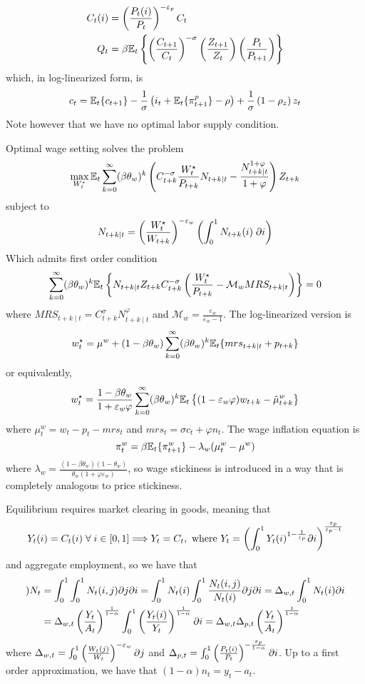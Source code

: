 \documentclass[10pt]{article}
\begin{document}
\begin{model}
	\begin{align*}
		C_t(i) &= \left( \frac{P_t(i)}{P_t}\right)^{-\varepsilon_p}C_t \\ Q_t &= \beta \mathbb{E}_t \left\{ \left( \frac{C_{t+1}}{C_t}\right)^{-\sigma}\left( \frac{Z_{t+1}}{Z_t}\right) \left( \frac{P_t}{P_{t+1}}\right)\right\}
	\end{align*}
	which, in log-linearized form, is\[c_t = \mathbb{E}_t\{c_{t+1}\} - \frac{1}{\sigma} \left( i_t + \mathbb{E}_t\{\pi_{t+1}^p\}-\rho\right) + \frac{1}{\sigma} \left( 1-\rho_z\right) z_t\]Note however that we have no optimal labor supply condition.
	
	Optimal wage setting solves the problem \[\max_{W_t^\star} \mathbb{E}_t \sum_{k=0}^\infty (\beta \theta_w)^k \left( C_{t+k}^{-\sigma} \frac{W_t^\star}{P_{t+k}}N_{t+k\mid t} - \frac{N_{t+k\mid t}^{1+\varphi}}{1+\varphi}\right) Z_{t+k}\]subject to\[N_{t+k\mid t} = \left( \frac{W_t^\star}{W_{t+k}}\right)^{-\varepsilon_w} \left( \int_0^1 N_{t+k}(i)\;\partial i\right)\]Which admits first order condition \[\sum_{k=0}^\infty (\beta\theta_w)^k \mathbb{E}_t \left\{ N_{t+k\mid t} Z_{t+k} C_{t+k}^{-\sigma} \left( \frac{W_t^\star}{P_{t+k}} - \mathcal{M}_w MRS_{t+k\mid t}\right)\right\} = 0\]where $MRS_{t+k\mid t} = C_{t+k}^\sigma N_{t+k\mid t}^\varphi$ and $\mathcal{M}_w = \frac{\varepsilon_w}{\varepsilon_w-1}$. The log-linearized version is \[w_t^\star = \mu^w + (1-\beta\theta_w) \sum_{k=0}^\infty (\beta\theta_w)^k \mathbb{E}_t\{mrs_{t+k\mid t} + p_{t+k}\}\]or equivalently, \[w_t^\star = \frac{1-\beta\theta_w}{1+\varepsilon_w\varphi} \sum_{k=0}^\infty (\beta\theta_w)^k \mathbb{E}_t\left\{ (1-\varepsilon_w\varphi)w_{t+k} - \hat{\mu}_{t+k}^w\right\}\]where $\mu_t^w = w_t - p_t - mrs_t$ and $mrs_t = \sigma c_t + \varphi n_t$. The wage inflation equation is \[\pi_t^w = \beta \mathbb{E}_t\{\pi_{t+1}^w\} - \lambda_w (\mu_t^w - \mu^w)\]where $\lambda_w = \frac{(1-\beta\theta_w)(1-\theta_w)}{\theta_w(1+\varphi \varepsilon_w)}$, so wage stickiness is introduced in a way that is completely analogous to price stickiness. 
	
	Equilibrium requires market clearing in goods, meaning that \[Y_t(i) = C_t(i) \forall i \in [0,1] \Longrightarrow Y_t = C_t,\text{ where } Y_t = \parl \int_0^1 Y_t(i)^{1-\frac{1}{\varepsilon_p}}\partial i\parr^{\frac{\varepsilon_p}{\varepsilon_p-1}}\]and aggregate employment, so we have that 
	\begin{align*})
		N_t &= \int_0^1 \int_0^1 N_t(i,j)\partial j \partial i = \int_0^1 N_t(i) \int_0^1 \frac{N_t(i,j)}{N_t(i)}\partial j\partial i = \Delta_{w,t} \int_0^1 N_t(i)\partial i \\ 
		&= \Delta_{w,t} \left( \frac{Y_t}{A_t}\right)^{\frac{1}{1-\alpha}} \int_0^1 \left( \frac{Y_t(i)}{Y_t}\right)^{\frac{1}{1-\alpha}}\partial i = \Delta_{w,t} \Delta_{p,t} \left( \frac{Y_t}{A_t}\right)^{\frac{1}{1-\alpha}}
 	\end{align*}
 	where $\Delta_{w,t} = \int_0^1 \left( \frac{W_t(j)}{W_t}\right)^{-\varepsilon_w}\partial j$ and $\Delta_{p,t} = \int_0^1 \left( \frac{P_t(i)}{P_t}\right)^{-\frac{\varepsilon_p}{1-\alpha}}\partial i$. Up to a first order approximation, we have that $(1-\alpha)n_t = y_t - a_t$.
 	

\end{model}
\end{document}
